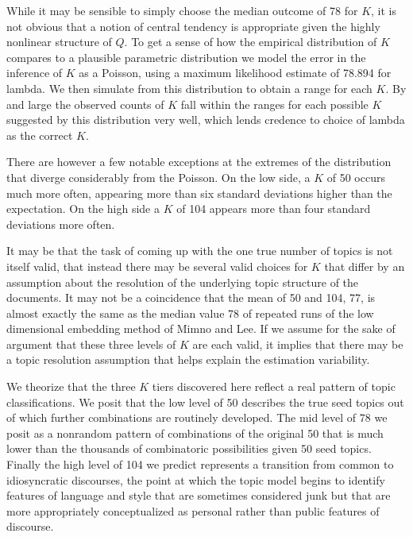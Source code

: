\documentclass[]{book}
\theoremstyle{definition}
\theoremstyle{definition}
\theoremstyle{definition}
\theoremstyle{remark}
\begin{document}
While it may be sensible to simply choose the median outcome of 78 for
\(K\), it is not obvious that a notion of central tendency is
appropriate given the highly nonlinear structure of \(Q\). To get a
sense of how the empirical distribution of \(K\) compares to a plausible
parametric distribution we model the error in the inference of \(K\) as
a Poisson, using a maximum likelihood estimate of 78.894 for lambda. We
then simulate from this distribution to obtain a range for each \(K\).
By and large the observed counts of \(K\) fall within the ranges for
each possible \(K\) suggested by this distribution very well, which
lends credence to choice of lambda as the correct \(K\).

There are however a few notable exceptions at the extremes of the
distribution that diverge considerably from the Poisson. On the low
side, a \(K\) of 50 occurs much more often, appearing more than six
standard deviations higher than the expectation. On the high side a
\(K\) of 104 appears more than four standard deviations more often.

It may be that the task of coming up with the one true number of topics
is not itself valid, that instead there may be several valid choices for
\(K\) that differ by an assumption about the resolution of the
underlying topic structure of the documents. It may not be a coincidence
that the mean of 50 and 104, 77, is almost exactly the same as the
median value 78 of repeated runs of the low dimensional embedding method
of Mimno and Lee. If we assume for the sake of argument that these three
levels of \(K\) are each valid, it implies that there may be a topic
resolution assumption that helps explain the estimation variability.

We theorize that the three \(K\) tiers discovered here reflect a real
pattern of topic classifications. We posit that the low level of 50
describes the true seed topics out of which further combinations are
routinely developed. The mid level of 78 we posit as a nonrandom pattern
of combinations of the original 50 that is much lower than the thousands
of combinatoric possibilities given 50 seed topics. Finally the high
level of 104 we predict represents a transition from common to
idiosyncratic discourses, the point at which the topic model begins to
identify features of language and style that are sometimes considered
junk but that are more appropriately conceptualized as personal rather
than public features of discourse.
\end{document}
